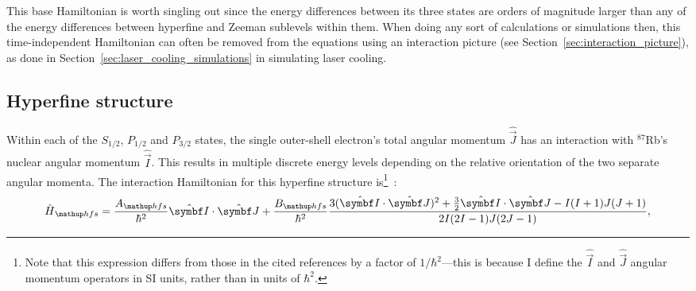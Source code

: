 This base Hamiltonian is worth singling out since the energy differences between its three states are orders of magnitude larger than any of the energy differences between hyperfine and Zeeman sublevels within them. When doing any sort of calculations or simulations then, this time-independent Hamiltonian can often be removed from the equations using an interaction picture (see Section~\ref{sec:interaction_picture}), as done in Section~\ref{sec:laser_cooling_simulations} in simulating laser cooling. 

\subsection{Hyperfine structure}\label{sec:hyperfine_structure}

Within each of the $S_{1/2}$, $P_{1/2}$ and $P_{3/2}$ states, the single outer-shell electron's total angular momentum $\hat {\vec J}$ has an interaction with $^{87}$Rb's nuclear angular momentum $\hat{\vec I}$. This results in multiple discrete energy levels depending on the relative orientation of the two separate angular momenta. The interaction Hamiltonian for this hyperfine structure is\footnote{Note that this expression differs from those in the cited references by a factor of $1/\hbar^2$---this is because I define the $\hat{\vec I}$ and $\hat{\vec J}$ angular momentum operators in SI units, rather than in units of $\hbar^2$.}~\cite{steck_rubidium_2015, arimondo_experimental_1977}:
\begin{align}\label{eq:H_hfs}
\hat H_\up{hfs} = \frac{A_\up{hfs}}{\hbar^2} \hat{\vec I} \cdot \hat {\vec J}
+ \frac{B_\up{hfs}}{\hbar^2}\frac
{3(\hat{\vec I}\cdot\hat{\vec J})^2 + \frac32 \hat{\vec I}\cdot\hat{\vec J} - I(I + 1)J(J + 1)}
{2I(2I - 1)J(2J - 1)},
\end{align}
